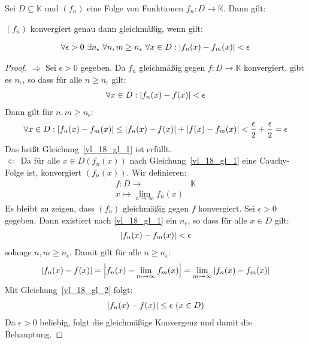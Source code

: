 \begin{Satz}{
	Sei $D \subseteq \mathbb{K}$ und $(f_n)$ eine Folge von Funktionen $f_n: D 
	\rightarrow \mathbb{K}$. Dann gilt: 
	\begin{center}
		$(f_n)$ konvergiert genau dann gleichmäßig, wenn gilt:
	\end{center}
	\begin{align}\label{vl_18_gl_1}
		\forall \epsilon > 0 \text{ } \exists n_{\epsilon} \text{ }\forall n,m \geq 	
		n_{\epsilon} \text{ }\forall x \in D : \abs{f_n(x) - f_m(x)} < \epsilon
	\end{align}
}\end{Satz}

\begin{proof}
	$\Rightarrow$ Sei $\epsilon > 0$ gegeben. Da $f_n$ gleichmäßig gegen $f: D 
	\rightarrow \mathbb{K}$ konvergiert, gibt es $n_{\epsilon}$, so dass für alle 
	$n \geq n_{\epsilon}$ gilt:
	\begin{align*}
		\forall x \in D: \abs{ f_n(x) -f(x)} < \epsilon
	\end{align*}
	Dann gilt für $n,m \geq n_{\epsilon}$:
	\begin{align*}
		\forall x \in D: \abs{f_n(x) - f_m(x)} \leq \abs{f_n(x) -f(x)} + 
		\abs{f(x) -f_m(x)} < \frac{\epsilon}{2} + \frac{\epsilon}{2} = \epsilon
	\end{align*}
	Das heißt Gleichung~\ref{vl_18_gl_1} ist erfüllt. \\
	$\Leftarrow$ Da für alle $x \in D (f_n(x))$ nach Gleichung~\ref{vl_18_gl_1} 
	eine Cauchy-Folge ist, konvergiert $(f_n(x))$.
	Wir definieren: 
	\begin{align*}
		f: D \rightarrow & \mathbb{K} \\
		x \mapsto \lim\limits_{n \rightarrow \infty} f_n(x)
	\end{align*}		
	Es bleibt zu zeigen, dass $(f_n)$ gleichmäßig gegen $f$ konvergiert. 
	Sei $\epsilon > 0$ gegeben. Dann existiert nach \ref{vl_18_gl_1} ein 
	$n_{\epsilon}$, so dass für alle $x \in D$ gilt:
	\begin{align}\label{vl_18_gl_2}
		\abs{f_n(x) - f_m(x)} < \epsilon
	\end{align}
	solange $n,m \geq n_{\epsilon}$. Damit gilt für alle $n \geq n_{\epsilon}$:
	\begin{align*}
		\abs{f_n(x) - f(x)} = \abs{f_n(x) - \lim\limits_{m \rightarrow \infty} 
		{f_m(x)}} = \lim\limits_{m \rightarrow \infty} \abs{f_n(x) - f_m(x)}
	\end{align*}
	Mit Gleichung~\ref{vl_18_gl_2} folgt:
	\begin{align*}
		\abs{f_n(x) -f(x)} \leq \epsilon \text{ } (x \in D)
\end{align*}		
	Da $\epsilon > 0$ beliebig, folgt die gleichmäßige Konvergenz und 
	damit die Behauptung.
\end{proof}

